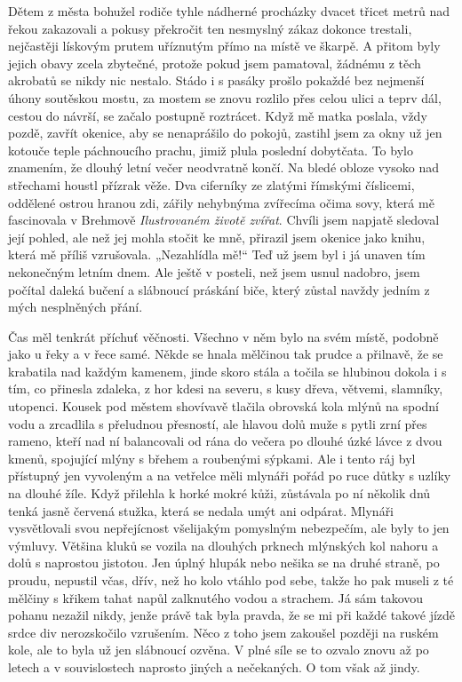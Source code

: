 Dětem z města bohužel rodiče tyhle nádherné procházky dvacet třicet metrů nad řekou zakazovali a pokusy překročit ten nesmyslný zákaz dokonce trestali, nejčastěji lískovým prutem uříznutým přímo na místě ve škarpě. A přitom byly jejich obavy zcela zbytečné, protože pokud jsem pamatoval, žádnému z těch akrobatů se nikdy nic nestalo. Stádo i s pasáky prošlo pokaždé bez nejmenší úhony soutěskou mostu, za mostem se znovu rozlilo přes celou ulici a teprv dál, cestou do návrší, se začalo postupně roztrácet. Když mě matka poslala, vždy pozdě, zavřít okenice, aby se nenaprášilo do pokojů, zastihl jsem za okny už jen kotouče teple páchnoucího prachu, jimiž plula poslední dobytčata. To bylo znamením, že dlouhý letní večer neodvratně končí. Na bledé obloze vysoko nad střechami houstl přízrak věže. Dva ciferníky ze zlatými římskými číslicemi, oddělené ostrou hranou zdi, zářily nehybnýma zvířecíma očima sovy, která mě fascinovala v Brehmově \textit{Ilustrovaném životě zvířat}. Chvíli jsem napjatě sledoval její pohled, ale než jej mohla stočit ke mně, přirazil jsem okenice jako knihu, která mě příliš vzrušovala. „Nezahlídla mě!“ Teď už jsem byl i já unaven tím nekonečným letním dnem. Ale ještě v posteli, než jsem usnul nadobro, jsem počítal daleká bučení a slábnoucí práskání biče, který zůstal navždy jedním z mých nesplněných přání.

\pagebreak

\noindent
Čas měl tenkrát příchuť věčnosti. Všechno v něm bylo na svém místě, podobně jako u řeky a v řece samé. Někde se hnala mělčinou tak prudce a přilnavě, že se krabatila nad každým kamenem, jinde skoro stála a točila se hlubinou dokola i s tím, co přinesla zdaleka, z hor kdesi na severu, s kusy dřeva, větvemi, slamníky, utopenci. Kousek pod městem shovívavě tlačila obrovská kola mlýnů na spodní vodu a zrcadlila s přeludnou přesností, ale hlavou dolů muže s pytli zrní přes rameno, kteří nad ní balancovali od rána do večera po dlouhé úzké lávce z dvou kmenů, spojující mlýny s břehem a roubenými sýpkami. Ale i tento ráj byl přístupný jen vyvoleným a na vetřelce měli mlynáři pořád po ruce důtky s uzlíky na dlouhé žíle. Když přilehla k horké mokré kůži, zůstávala po ní několik dnů tenká jasně červená stužka, která se nedala umýt ani odpárat. Mlynáři vysvětlovali svou nepřejícnost všelijakým pomyslným nebezpečím, ale byly to jen výmluvy. Většina kluků se vozila na dlouhých prknech mlýnských kol nahoru a dolů s naprostou jistotou. Jen úplný hlupák nebo nešika se na druhé straně, po proudu, nepustil včas, dřív, než ho kolo vtáhlo pod sebe, takže ho pak museli z té mělčiny s křikem tahat napůl zalknutého vodou a strachem. Já sám takovou pohanu nezažil nikdy, jenže právě tak byla pravda, že se mi při každé takové jízdě srdce div nerozskočilo vzrušením. Něco z toho jsem zakoušel později na ruském kole, ale to byla už jen slábnoucí ozvěna. V plné síle se to ozvalo znovu až po letech a v souvislostech naprosto jiných a nečekaných. O tom však až jindy. 

